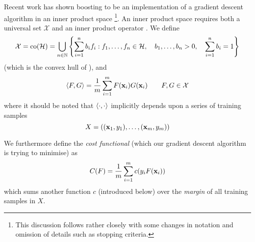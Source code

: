 Recent work has shown boosting to be an implementation of a gradient
descent algorithm in an inner product space \cite{Mason99}%
\footnote{This discussion follows \cite{Mason99} rather closely with
some changes in notation and omission of details such as stopping
criteria.}.
An inner product space requires both a universal set $\mathcal{X}$ and
an inner product operator \ip{\cdot}{\cdot}.  We define
%
\begin{equation}
\mathcal{X} = 
\mathrm{co} (\mathcal{H}) =
 \bigcup _{n \in \mathbb{N}}
\left\{
 \sum_{i=1}^{n}
  b_i
f_i : f_1, \ldots, f_n \in \mathcal{H}, \quad
 b_1, \ldots, b_n > 0, \quad
 \sum_{i=1}^{n} b_i = 1
\right\}
\end{equation}
%
(which is the convex hull of \calH), and
%
\begin{equation}
\langle {F} , {G} \rangle = \frac{1}{m} \sum_{i=1}^{m} F(\mathbf{x}_i)G(\mathbf{x}_i) \qquad
F, G \in \mathcal{X}
\label{eqn:inner product definition}
\end{equation}
%
where it should be noted that $\langle {\cdot} , {\cdot} \rangle$ implicitly depends
upon a series of training samples
%
\begin{equation}
X = ((\mathbf{x}_1, y_1), \ldots, (\mathbf{x}_m, y_m))
\end{equation}

We furthermore define the \emph{cost functional} (which our gradient
descent algorithm is trying to minimise) as
%
\begin{equation}
\label{eqn:gradient descent cost functional}
C(F) = \frac{1}{m} \sum_{i=1}^{m} c(y_i F(\mathbf{x}_i))
\end{equation}
%
which sums another function $c$ (introduced below) over the
\emph{margin} of all training samples in $X$.


